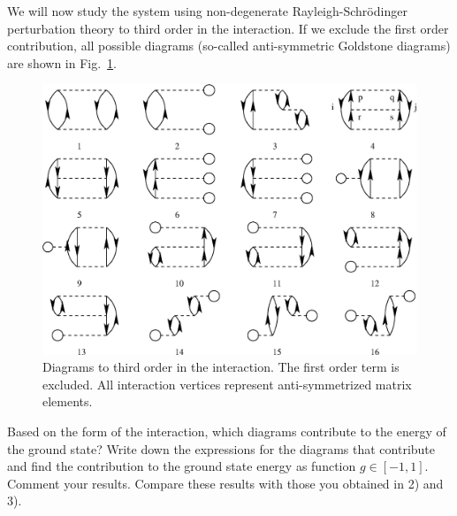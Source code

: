 \documentclass[prc]{revtex4}
\begin{document}
\begin{enumerate}
        We will now study the system using non-degenerate
        Rayleigh-Schr\"odinger perturbation theory to third order in the
        interaction.  If we exclude the first order contribution, all possible
        diagrams (so-called anti-symmetric Goldstone diagrams) are
        shown in Fig.~\ref{fig:diagrams}.
        \begin{figure}[hbtp]
            \includegraphics[width=.6\textwidth]{figures/diagrams.eps}
            \caption{Diagrams to third order in the interaction. The first order
            term is excluded. All interaction vertices represent anti-symmetrized matrix elements.\label{fig:diagrams}}
        \end{figure}

        Based on the form of the interaction, which diagrams contribute to the
        energy of the ground state?  Write down the expressions for
        the diagrams that contribute and find the contribution to the ground
        state energy as function $g\in [-1,1]$. Comment your results.  Compare
these results with those you obtained in 2) and 3).


\end{enumerate}
\end{document}
